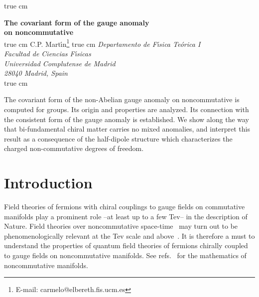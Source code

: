 \documentclass[a4paper,12pt]{article}
\def\RR{{\rm I\!\!\, R}}
\begin{document}
\begin{titlepage}


 true cm
\begin{center}
{\Large \bf The covariant form of the gauge anomaly\\[9pt]
on noncommutative \myHighlight{$\RR^{2 n}$}\coordHE{}}\\ 
 true cm 
{\rm C.P. Mart\'{\i}n}\footnote{E-mail: carmelo@elbereth.fis.ucm.es}
 true cm
{\it Departamento de F\'{\i}sica Te\'orica I}\\
{\it Facultad de Ciencias F\'{\i}sicas}\\ 
{\it Universidad Complutense de Madrid}\\
{\it 28040 Madrid, Spain}\\
 true cm

{\leftskip=45pt \rightskip=45pt 
\noindent
The covariant form of the non-Abelian gauge anomaly on noncommutative 
\myHighlight{$\RR^{2 n}$}\coordHE{} is computed for \coordHE{} groups. Its origin and  properties  
are analyzed.  
Its connection with the consistent form of the gauge anomaly is established. 
We show along the way that bi-fundamental \coordHE{} chiral matter 
carries no mixed anomalies, and interpret this result as a consequence of 
the half-dipole structure which  characterizes the charged non-commutative 
degrees of freedom. \par }
\end{center}

\vfil



\end{titlepage}
\setcounter{page}{2}



\section{Introduction}

Field theories of fermions with chiral couplings to gauge fields on  
commutative manifolds play a prominent role --at least up to a few Tev-- in 
the description of Nature.
Field theories over noncommutative 
space-time~\cite{Douglas:2001ba, Szabo:2001kg} may 
turn out to be phenomenologically relevant at the Tev scale and 
above~\cite{Riad:2000vy, Arfaei:2000kh, Hewett:2001zp, Mathews:2001we, Baek:2001ty, Grosse:2001ei, Grosse:2001xz, 
Chaichian:2001py, Wang:2001ig}.
It is therefore a must to understand the properties of quantum 
field theories of fermions chirally coupled to gauge fields on
noncommutative manifolds. See refs.~\cite{Connes:1994, Madore:1999, Landi:1997sh, Gracia-Bondia:2001tr} for the mathematics of noncommutative manifolds.
\end{document}
